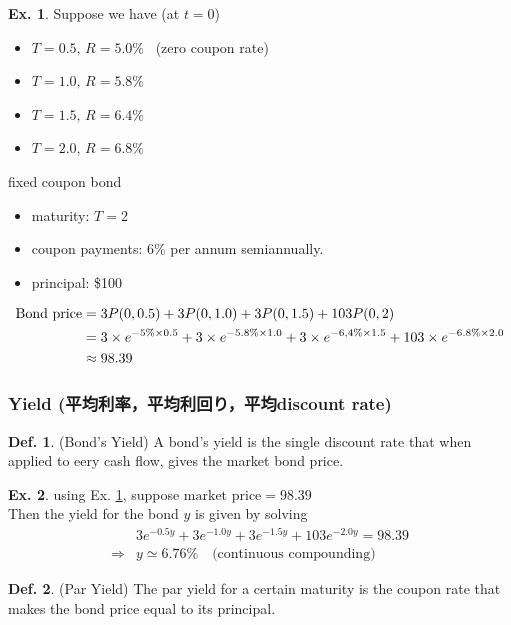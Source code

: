 \documentclass[a4paper,11pt]{jsarticle}
\theoremstyle{definition}
\newtheorem{definition}{Def.}[subsection]
\newtheorem{ex}{Ex.}[subsection]
\begin{document}
\begin{ex}\label{bondprice}
  Suppose we have (at $t=0$)
  \begin{itemize}
    \item $T=0.5, \, R=5.0\%$ \, (zero coupon rate)
    \item $T=1.0, \, R=5.8\%$
    \item $T=1.5, \, R=6.4\%$
    \item $T=2.0, \, R=6.8\%$
  \end{itemize}
  fixed coupon bond
  \begin{itemize}
    \item maturity: $T=2$
    \item coupon payments: 6\% per annum semiannually.
    \item principal: \$100
  \end{itemize}
  \begin{align}
    \mbox{Bond price}&=3P(0,0.5)+3P(0,1.0)+3P(0,1.5)+103P(0,2) \notag\\
    &=3\times e^{-5\%\times 0.5}+3\times e^{-5.8\%\times 1.0}
    +3\times e^{-6,4\%\times 1.5}+103\times e^{-6.8\%\times 2.0} \notag\\
    &\approx 98.39
  \end{align}
\end{ex} 


\subsubsection{Yield (平均利率，平均利回り，平均discount rate)}
\begin{definition}{(Bond's Yield)}
  A bond's yield is the single discount rate
  that when applied to eery cash flow,
  gives the market bond price.
\end{definition}

\begin{ex}
  using Ex. \ref{bondprice}, 
  suppose $\mbox{market price} = 98.39$ \\
  Then the yield for the bond $y$ is given by solving
  \begin{align}
    &3e^{-0.5y}+3e^{-1.0y}+3e^{-1.5y}+103e^{-2.0y} = 98.39 \\
    \Rightarrow& y \simeq 6.76\% \quad \mbox{(continuous compounding)}
  \end{align}
\end{ex}

\begin{definition}{(Par Yield)}
  The par yield for a certain maturity is the coupon rate
  that makes the bond price equal to its principal.
\end{definition}
\end{document}
